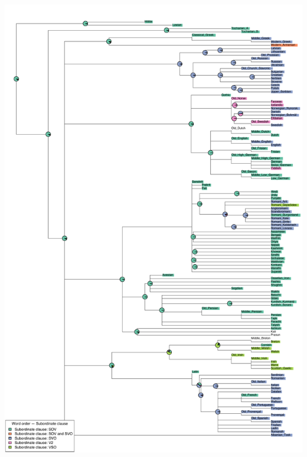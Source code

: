 \includegraphics[width=.9\linewidth]{supp-graphics/WordorderSubordinateclauseSOVWordorderSubordinateclauseSVOWordorderSubordinateclauseV2WordorderSubordinateclauseVSO.pdf}

